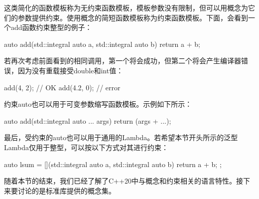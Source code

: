这类简化的函数模板称为无约束函数模板，模板参数没有限制，但可以用概念为它们的参数提供约束。使用概念的简短函数模板称为约束函数模板。下面，会看到一个add函数约束整型的例子：

\begin{cpp}
auto add(std::integral auto a, std::integral auto b)
{
	return a + b;
}
\end{cpp}

若再次考虑前面看到的相同调用，第一个将会成功，但第二个将会产生编译器错误，因为没有重载接受double和int值：

\begin{cpp}
add(4, 2); // OK
add(4.2, 0); // error
\end{cpp}

约束auto也可以用于可变参数缩写函数模板。示例如下所示：

\begin{cpp}
auto add(std::integral auto ... args)
{
	return (args + ...);
}
\end{cpp}

最后，受约束的auto也可以用于通用的Lambda。若希望本节开头所示的泛型Lambda仅用于整型，可以按以下方式对其进行约束：

\begin{cpp}
auto lsum = [](std::integral auto a, std::integral auto b)
{
	return a + b;
};
\end{cpp}

随着本节的结束，我们已经了解了C++20中与概念和约束相关的语言特性。接下来要讨论的是标准库提供的概念集。






























